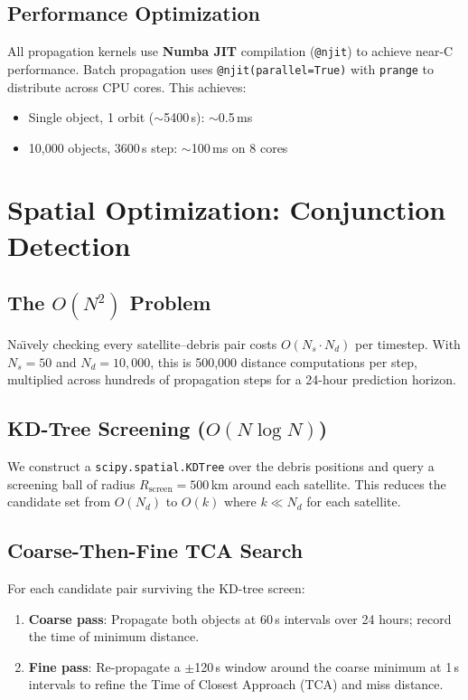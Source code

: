 \documentclass[11pt, a4paper]{article}
\begin{document}
\subsection{Performance Optimization}

All propagation kernels use \textbf{Numba JIT} compilation (\texttt{@njit}) to achieve near-C performance. Batch propagation uses \texttt{@njit(parallel=True)} with \texttt{prange} to distribute across CPU cores. This achieves:

\begin{itemize}[nosep]
  \item Single object, 1 orbit ($\sim$5400\,s): $\sim$0.5\,ms
  \item 10{,}000 objects, 3600\,s step: $\sim$100\,ms on 8 cores
\end{itemize}

\section{Spatial Optimization: Conjunction Detection}

\subsection{The $O(N^2)$ Problem}

Na\"{\i}vely checking every satellite--debris pair costs $O(N_s \cdot N_d)$ per timestep. With $N_s = 50$ and $N_d = 10{,}000$, this is 500{,}000 distance computations per step, multiplied across hundreds of propagation steps for a 24-hour prediction horizon.

\subsection{KD-Tree Screening ($O(N \log N)$)}

We construct a \texttt{scipy.spatial.KDTree} over the debris positions and query a screening ball of radius $R_\text{screen} = 500$\,km around each satellite. This reduces the candidate set from $O(N_d)$ to $O(k)$ where $k \ll N_d$ for each satellite.

\subsection{Coarse-Then-Fine TCA Search}

For each candidate pair surviving the KD-tree screen:
\begin{enumerate}[nosep]
  \item \textbf{Coarse pass}: Propagate both objects at 60\,s intervals over 24 hours; record the time of minimum distance.
  \item \textbf{Fine pass}: Re-propagate a $\pm$120\,s window around the coarse minimum at 1\,s intervals to refine the Time of Closest Approach (TCA) and miss distance.
\end{enumerate}
\end{document}

